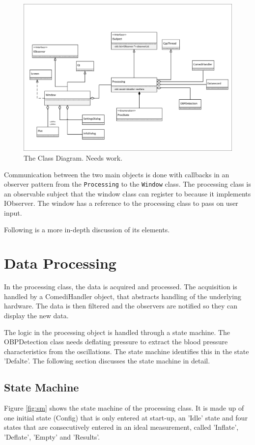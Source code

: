 \begin{figure}[ht]
\centering
\includegraphics[width=\textwidth]{figures/cd2.pdf}
\caption{The Class Diagram. Needs work.}
\label{fig:CD}
\end{figure}

Communication between the  two main objects is done with callbacks in an observer pattern from the \texttt{Processing} to the \texttt{Window} class. The processing class is an observable subject that the window class can register to because it implements IObserver. The window has a reference to the processing class to pass on user input.

Following is a more in-depth discussion of its elements.

\section{Data Processing}
In the processing class, the data is acquired and processed. The acquisition is handled by a ComediHandler object, that abstracts handling of the underlying hardware. The data is then filtered and the observers are notified so they can display the new data. 

The logic in the processing object is handled through a state machine. The OBPDetection class needs deflating pressure to extract the blood pressure characteristics from the oscillations. The state machine identifies this in the state 'Defalte'. The following section discusses the state machine in detail.

\subsection{State Machine}
Figure \ref{fig:sm} shows the state machine of the processing class. It is made up of one initial state (Config) that is only entered at start-up, an 'Idle' state and four states that are consecutively entered in an ideal measurement, called 'Inflate', 'Deflate', 'Empty' and 'Results'.

